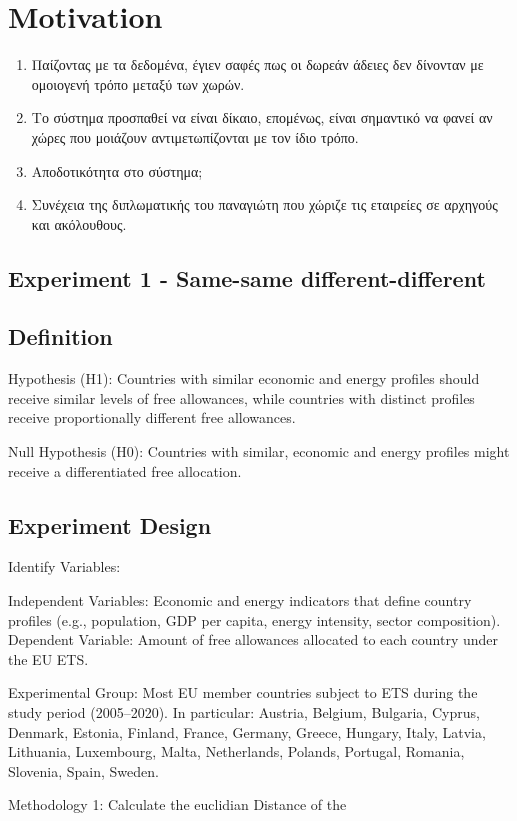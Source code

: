 \section{Motivation}
\begin{enumerate}
    \item Παίζοντας με τα δεδομένα, έγιεν σαφές πως οι δωρεάν άδειες δεν δίνονταν με ομοιογενή τρόπο μεταξύ των χωρών.
    \item Το σύστημα προσπαθεί να είναι δίκαιο, επομένως, είναι σημαντικό να φανεί αν χώρες που μοιάζουν αντιμετωπίζονται με τον ίδιο τρόπο. 
    \item Αποδοτικότητα στο σύστημα;
    \item Συνέχεια της διπλωματικής του παναγιώτη που χώριζε τις εταιρείες σε αρχηγούς και ακόλουθους. 
\end{enumerate}

\subsection{Experiment 1 - Same-same different-different}
\subsection{Definition}
Hypothesis (H1): Countries with similar economic and energy profiles should receive similar levels of free allowances, while countries with distinct profiles receive proportionally different free allowances. 

Null Hypothesis (H0): Countries with similar, economic and energy profiles might receive a differentiated free allocation.  
\subsection{Experiment Design}
Identify Variables:

Independent Variables: Economic and energy indicators that define country profiles (e.g., population, GDP per capita, energy intensity, sector composition).
Dependent Variable: Amount of free allowances allocated to each country under the EU ETS.

Experimental Group: Most EU member countries subject to ETS during the study period (2005–2020). In particular: Austria, Belgium, Bulgaria, Cyprus, Denmark, Estonia, Finland, France, Germany, Greece, Hungary, Italy, Latvia, Lithuania, Luxembourg, Malta, Netherlands, Polands, Portugal, Romania, Slovenia, Spain, Sweden.

Methodology 1:
Calculate the euclidian Distance of the 




